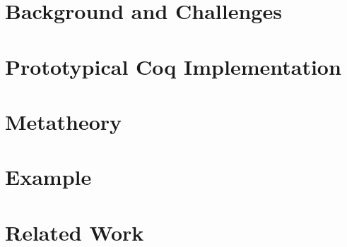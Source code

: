
\section{Background and Challenges}
\label{sec:background+challenge}




\newcommand{\denotes}[1]{{\llbracket {#1} \rrbracket}}
\newcommand{\denotesS}[1]{{{\llbracket {#1} \rrbracket}_S}}
\newcommand{\goodCtx}[2]{{ {#1} \ \vdash }}
\newcommand{\goodType}[3]{{ {#1} \vdash {#2} }}
\newcommand{\goodTerm}[3]{{ {#1} \vdash {#2} : {#3} }}
\newcommand{\goodSub}[3]{{ {#1} \vdash {#2} : {#3} }}
\newcommand{\goodSig}[3]{{ {#1} \vdash {#2} \ \  Sig^{#3} }}
\newcommand{\goodWSig}[3]{{ {#1} \vdash {#2} \ \ WSig^{#3} }}
\newcommand{\goodSeal}[4]{{ {#1} \vdash {#2} : {#3} \  |\  {#4} }}
\newcommand{\goodInh}[4]{{ {#1} \vdash {#2} : {#3} \twoheadrightarrow {#4}}}
\newcommand{\nat}{\mathbf{N}}

\newcommand{\cU}{{\mathcal{U}}}
\newcommand{\cB}{{\mathbb{B}}}
\newcommand{\cL}{{\mathcal{L}}}
\newcommand{\cC}{{\mathcal{C}}}
\newcommand{\cCt}{{\mathcal{C}_t}}
\newcommand{\bW}{{\mathbb{W}}}



\section{Prototypical Coq Implementation}
\label{sec:coqimpl}


\section{Metatheory}

\label{sec:metatheory}





\section{Example}\label{sec:coqexample}


\section{Related Work}\label{sec:related-work}


